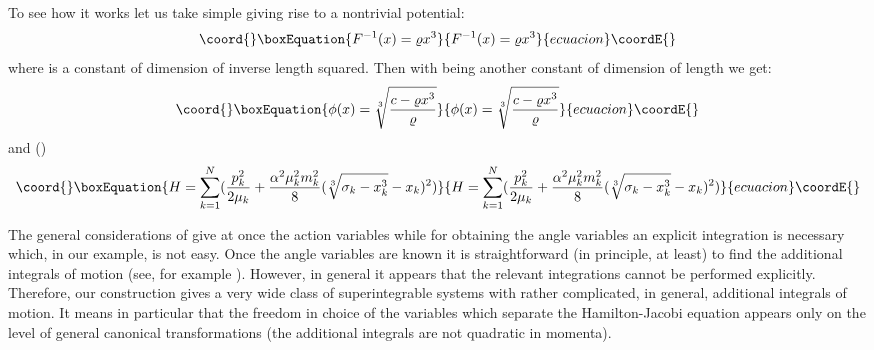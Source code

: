\documentclass[a4paper,12pt]{article}
\begin{document}
To see how it works let us take simple \coordHE{} giving rise to a nontrivial potential:
\begin{equation}\coord{}\boxEquation{
F^{-1}(x)=\varrho x^3
\label{w3}
}{
F^{-1}(x)=\varrho x^3
}{ecuacion}\coordE{}\end{equation}
where \myHighlight{$\varrho$}\coordHE{} is a constant of dimension of inverse length squared. Then with \coordHE{} being another 
constant of dimension of length we get:
\begin{equation}\coord{}\boxEquation{
\phi(x)=\sqrt[3]{\displaystyle\frac{c-\varrho x^3}{\varrho}}
\label{w4}
}{
\phi(x)=\sqrt[3]{\displaystyle\frac{c-\varrho x^3}{\varrho}}
}{ecuacion}\coordE{}\end{equation}
and (\coordHE{})
\begin{equation}\coord{}\boxEquation{
H=\sum_{k=1}^N(\frac{p_k^2}{2\mu_k}+\frac{\alpha^2\mu_k^2m_k^2}{8}(\sqrt[3]{\sigma_k-x_k^3}-x_k)^2)
\label{w5}
}{
H=\sum_{k=1}^N(\frac{p_k^2}{2\mu_k}+\frac{\alpha^2\mu_k^2m_k^2}{8}(\sqrt[3]{\sigma_k-x_k^3}-x_k)^2)
}{ecuacion}\coordE{}\end{equation}

The general considerations of \cite{1} give at once the action variables while for obtaining
 the angle variables an explicit integration is necessary which, in our example, is not easy. Once
the angle variables are known it is straightforward (in principle, at least) to find the additional 
integrals of motion (see, for example \cite{7,8}). However, in general it appears that 
the relevant integrations cannot be performed explicitly. Therefore, our construction gives a very
wide class of superintegrable systems with rather complicated, in general, additional integrals of motion.
It means in particular that the freedom in choice of the variables which separate the
Hamilton-Jacobi equation appears only on the level of general canonical transformations 
(the additional integrals are not quadratic in momenta).
\end{document}
